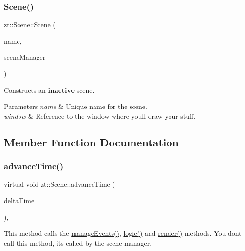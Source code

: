 \subsubsection{\texorpdfstring{Scene()}{Scene()}}
{\footnotesize\ttfamily zt\+::\+Scene\+::\+Scene (\begin{DoxyParamCaption}\item[{std\+::string}]{name,  }\item[{\hyperlink{classzt_1_1_scene_manager}{Scene\+Manager} \&}]{scene\+Manager }\end{DoxyParamCaption})}



Constructs an {\bfseries inactive} scene. 


\begin{DoxyParams}{Parameters}
{\em name} & Unique name for the scene. \\
\hline
{\em window} & Reference to the window where you\textquotesingle{}ll draw your stuff. \\
\hline
\end{DoxyParams}


\subsection{Member Function Documentation}
\mbox{\label{classzt_1_1_scene_ac5440bbe62a44eda2d4b3d1dde5d3d6a}} 
\subsubsection{\texorpdfstring{advance\+Time()}{advanceTime()}}
{\footnotesize\ttfamily virtual void zt\+::\+Scene\+::advance\+Time (\begin{DoxyParamCaption}\item[{float}]{delta\+Time }\end{DoxyParamCaption})\hspace{0.3cm}{\ttfamily [protected]}, {\ttfamily [virtual]}}



This method calls the \hyperlink{classzt_1_1_scene_ac450fd3460c158c0a3f2661df0410477}{manage\+Events()}, \hyperlink{classzt_1_1_scene_a1150eb60893f3077ecacf94b309414bf}{logic()} and \hyperlink{classzt_1_1_scene_aa554c0468228aa1aab7e553c52c7b0d4}{render()} methods. You don\textquotesingle{}t call this method, it\textquotesingle{}s called by the scene manager. 

